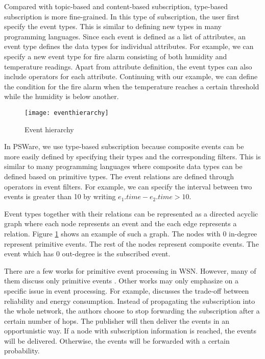 Compared with topic-based and content-based subscription, type-based subscription is more fine-grained. In this type of subscription, the user first specify the event types. This is similar to defining new types in many programming languages. Since each event is defined as a list of attributes, an event type defines the data types for individual attributes. For example, we can specify a new event type for fire alarm consisting of both humidity and temperature readings. Apart from attribute definition, the event types can also include operators for each attribute. Continuing with our example, we can define the condition for the fire alarm when the temperature reaches a certain threshold while the humidity is below another. 

\begin{figure}
\centering
\texttt{[image: eventhierarchy]}
\caption{Event hierarchy}
\label{fig:eventhierarchy}
\end{figure}

In PSWare, we use type-based subscription because composite events can be more easily defined by specifying their types and the corresponding filters. This is similar to many programming languages where composite data types can be defined based on primitive types. The event relations are defined through operators in event filters. For example, we can specify the interval between two events is greater than 10 by writing \(e_1.time - e_2.time > 10\).

Event types together with their relations can be represented as a directed acyclic graph where each node represents an event and the each edge represents a relation. Figure \ref{fig:eventhierarchy} shows an example of such a graph. The nodes with 0 in-degree represent primitive events. The rest of the nodes represent composite events. The event which has 0 out-degree is the subscribed event.

There are a few works for primitive event processing in WSN. However, many of them discuss only primitive events \cite{lowlevelnaming, directeddiffusion, mires}. Other works may only emphasize on a specific issue in event processing. For example, \cite{sp} discusses the trade-off between reliability and energy consumption. Instead of propagating the subscription into the whole network, the authors choose to stop forwarding the subscription after a certain number of hops. The publisher will then deliver the events in an opportunistic way. If a node with subscription information is reached, the events will be delivered. Otherwise, the events will be forwarded with a certain probability.


